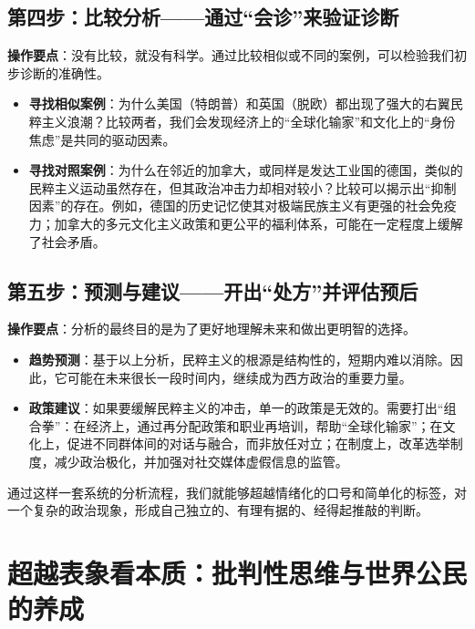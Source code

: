 \subsection{第四步：比较分析——通过“会诊”来验证诊断}
\textbf{操作要点}：没有比较，就没有科学。通过比较相似或不同的案例，可以检验我们初步诊断的准确性。
\begin{itemize}
    \item \textbf{寻找相似案例}：为什么美国（特朗普）和英国（脱欧）都出现了强大的右翼民粹主义浪潮？比较两者，我们会发现经济上的“全球化输家”和文化上的“身份焦虑”是共同的驱动因素。
    \item \textbf{寻找对照案例}：为什么在邻近的加拿大，或同样是发达工业国的德国，类似的民粹主义运动虽然存在，但其政治冲击力却相对较小？比较可以揭示出“抑制因素”的存在。例如，德国的历史记忆使其对极端民族主义有更强的社会免疫力；加拿大的多元文化主义政策和更公平的福利体系，可能在一定程度上缓解了社会矛盾。
\end{itemize}

\subsection{第五步：预测与建议——开出“处方”并评估预后}
\textbf{操作要点}：分析的最终目的是为了更好地理解未来和做出更明智的选择。
\begin{itemize}
    \item \textbf{趋势预测}：基于以上分析，民粹主义的根源是结构性的，短期内难以消除。因此，它可能在未来很长一段时间内，继续成为西方政治的重要力量。
    \item \textbf{政策建议}：如果要缓解民粹主义的冲击，单一的政策是无效的。需要打出“组合拳”：在经济上，通过再分配政策和职业再培训，帮助“全球化输家”；在文化上，促进不同群体间的对话与融合，而非放任对立；在制度上，改革选举制度，减少政治极化，并加强对社交媒体虚假信息的监管。
\end{itemize}

通过这样一套系统的分析流程，我们就能够超越情绪化的口号和简单化的标签，对一个复杂的政治现象，形成自己独立的、有理有据的、经得起推敲的判断。

\section{超越表象看本质：批判性思维与世界公民的养成}


